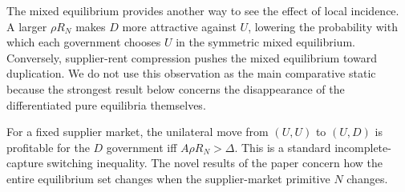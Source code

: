The mixed equilibrium provides another way to see the effect of local incidence. A larger $\rho R_N$ makes $D$ more attractive against $U$, lowering the probability with which each government chooses $U$ in the symmetric mixed equilibrium. Conversely, supplier-rent compression pushes the mixed equilibrium toward duplication. We do not use this observation as the main comparative static because the strongest result below concerns the disappearance of the differentiated pure equilibria themselves.

\begin{remark}
\label{rem:fixedN}
For a fixed supplier market, the unilateral move from $(U,U)$ to $(U,D)$ is profitable for the $D$ government iff $A\rho R_N>\Delta$. This is a standard incomplete-capture switching inequality. The novel results of the paper concern how the entire equilibrium set changes when the supplier-market primitive $N$ changes.
\end{remark}

